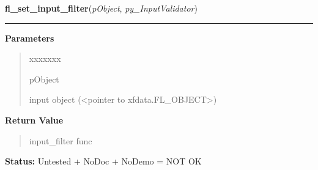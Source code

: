 \hspace{.8\funcindent}\begin{boxedminipage}{\funcwidth}

    \raggedright \textbf{fl\_set\_input\_filter}(\textit{pObject}, \textit{py\_InputValidator})

    \vspace{-1.5ex}

    \rule{\textwidth}{0.5\fboxrule}
\setlength{\parskip}{2ex}
\setlength{\parskip}{1ex}
      \textbf{Parameters}
      \vspace{-1ex}

      \begin{quote}
        \begin{Ventry}{xxxxxxx}

          \item[pObject]

          input object ({\textless}pointer to 
          xfdata.FL\_OBJECT{\textgreater})

        \end{Ventry}

      \end{quote}

      \textbf{Return Value}
    \vspace{-1ex}

      \begin{quote}
      input\_filter func

      \end{quote}

\textbf{Status:} Untested + NoDoc + NoDemo = NOT OK



    \end{boxedminipage}

    \label{xformslib:library:fl_validate_input}

    \vspace{0.5ex}

